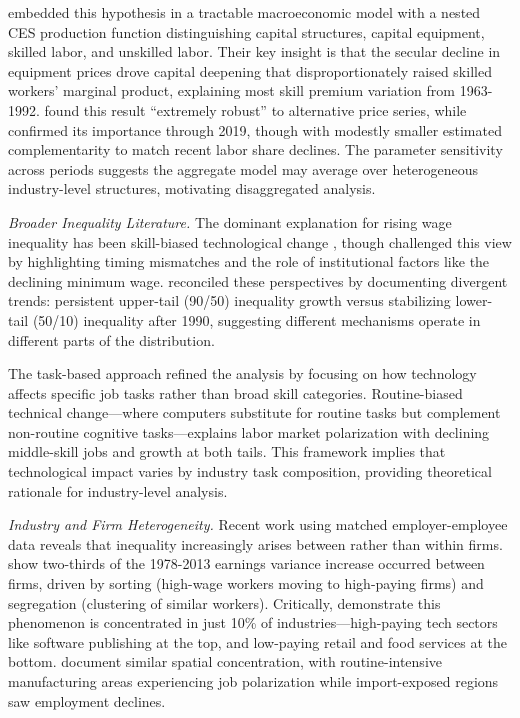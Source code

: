 \documentclass[12pt]{article}
\begin{document}
\citet{krusell2000capital} embedded this hypothesis in a tractable macroeconomic model with a nested CES production function distinguishing capital structures, capital equipment, skilled labor, and unskilled labor. Their key insight is that the secular decline in equipment prices drove capital deepening that disproportionately raised skilled workers' marginal product, explaining most skill premium variation from 1963-1992. \citet{polgreen2008capital} found this result ``extremely robust'' to alternative price series, while \citet{ohanian2021revisiting} confirmed its importance through 2019, though with modestly smaller estimated complementarity to match recent labor share declines. The parameter sensitivity across periods suggests the aggregate model may average over heterogeneous industry-level structures, motivating disaggregated analysis.

\textit{Broader Inequality Literature.}
The dominant explanation for rising wage inequality has been skill-biased technological change \citep{katz1992changes, goldin2008race}, though \citet{card2002skill} challenged this view by highlighting timing mismatches and the role of institutional factors like the declining minimum wage. \citet{autor2008trends} reconciled these perspectives by documenting divergent trends: persistent upper-tail (90/50) inequality growth versus stabilizing lower-tail (50/10) inequality after 1990, suggesting different mechanisms operate in different parts of the distribution.

The task-based approach \citep{autor2003skill, acemoglu2011skills} refined the analysis by focusing on how technology affects specific job tasks rather than broad skill categories. Routine-biased technical change---where computers substitute for routine tasks but complement non-routine cognitive tasks---explains labor market polarization with declining middle-skill jobs and growth at both tails. This framework implies that technological impact varies by industry task composition, providing theoretical rationale for industry-level analysis.

\textit{Industry and Firm Heterogeneity.}
Recent work using matched employer-employee data reveals that inequality increasingly arises between rather than within firms. \citet{song2019firming} show two-thirds of the 1978-2013 earnings variance increase occurred between firms, driven by sorting (high-wage workers moving to high-paying firms) and segregation (clustering of similar workers). Critically, \citet{haltiwanger2022industries} demonstrate this phenomenon is concentrated in just 10\% of industries---high-paying tech sectors like software publishing at the top, and low-paying retail and food services at the bottom. \citet{autor2013geography, autor2015untangling} document similar spatial concentration, with routine-intensive manufacturing areas experiencing job polarization while import-exposed regions saw employment declines.
\end{document}

